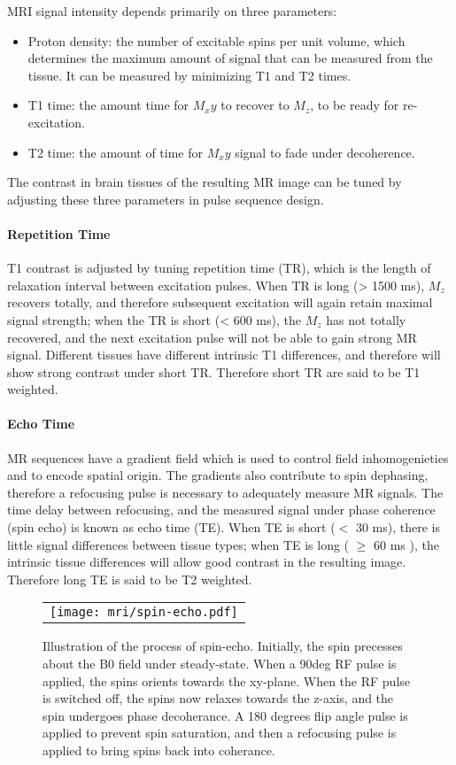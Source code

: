 MRI signal intensity depends primarily on three parameters: 
\begin{itemize}
\item Proton density: the number of excitable spins per unit volume, which determines the maximum amount of signal that can be measured from the tissue. It can be measured by minimizing T1 and T2 times. 
\item T1 time: the amount time for $M_xy$ to recover to $M_z$, to be ready for re-excitation.
\item T2 time: the amount of time for $M_xy$ signal to fade under decoherence. 
\end{itemize}
The contrast in brain tissues of the resulting MR image can be tuned by adjusting these three parameters in pulse sequence design.

\paragraph{Repetition Time}
T1 contrast is adjusted by tuning repetition time (TR), which is the length of relaxation interval between excitation pulses. When TR is long (> 1500 ms), $M_z$ recovers totally, and therefore subsequent excitation will again retain maximal signal strength; when the TR is short (< 600 ms), the $M_z$ has not totally recovered, and the next excitation pulse will not be able to gain strong MR signal. Different tissues have different intrinsic T1 differences, and therefore will show strong contrast under short TR. Therefore short TR are said to be T1 weighted. 

\paragraph{Echo Time}
MR sequences have a gradient field which is used to control field  inhomogenieties and to encode spatial origin. The gradients also contribute to spin dephasing, therefore a refocusing pulse is necessary to adequately measure MR signals. The time delay between refocusing, and the measured signal under phase coherence (spin echo) is known as echo time (TE). When TE is short ($<$ 30 ms), there is little signal differences between tissue types; when TE is long ( $\geq$ 60 ms ), the intrinsic tissue differences will allow good contrast in the resulting image. Therefore long TE is said to be T2 weighted.

\begin{figure}[htb]
\begin{center}
\begin{tabular}{c}
\texttt{[image: mri/spin-echo.pdf]}
\end{tabular}
\caption{Illustration of the process of spin-echo. Initially, the spin precesses about the B0 field under steady-state. When a 90deg RF pulse is applied, the spins orients towards the xy-plane. When the RF pulse is switched off, the spins now relaxes towards the z-axis, and the spin undergoes phase decoherance. A 180 degrees flip angle pulse is applied to prevent spin saturation, and then a refocusing pulse is applied to bring spins back into coherance.  } \label{fig:spin-echo}
\end{center}
\end{figure}

